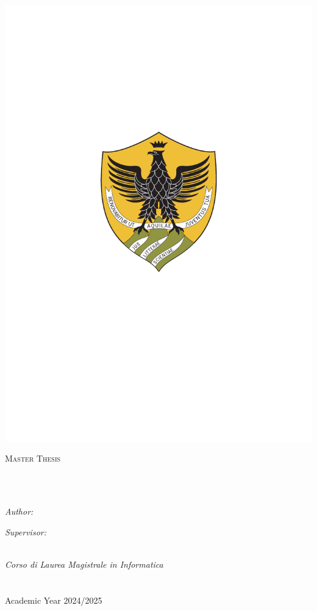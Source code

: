 \documentclass[
11pt, %
english, %
singlespacing, %
headsepline, %
]{MastersDoctoralThesis} %
\author{Sarosh \textsc{Krishan}} %
\begin{document}
\frontmatter %

\pagestyle{plain} %


\begin{titlepage}
\begin{center}
\vspace*{.06\textheight}
\includegraphics[width=0.2\linewidth]{Figures/logos/univaq.pdf}

{\scshape\LARGE \univname\par}\vspace{1.5cm} %
\textsc{\Large Master Thesis}\\[0.5cm] %
\HRule \\[0.4cm] %
{\huge \bfseries \ttitle\par}\vspace{0.4cm} %
\HRule \\[1.5cm] %
\begin{minipage}[t]{0.4\textwidth}
\begin{flushleft} \large
\emph{Author:}\\
\href{https://github.com/lhamu}{\authorname} %
\end{flushleft}
\end{minipage}
\begin{minipage}[t]{0.4\textwidth}
\begin{flushright} \large
\emph{Supervisor:} \\
\href{https://www.disim.univaq.it/ThanhPhuong}{\supname} %
\end{flushright}
\end{minipage}\\[3cm]
\vfill
\large \textit{Corso di Laurea Magistrale in Informatica}\\[0.3cm] %
\textit{}\\[0.4cm]
\deptname\\[0.5cm] %
\vfill
{\large Academic Year 2024/2025}\\[2cm] %
\vfill
\end{center}
\end{titlepage}
\end{document}
